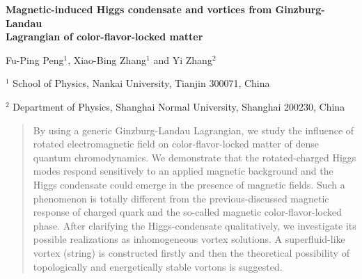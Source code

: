\documentclass[12pt]{article}
\begin{document}
\vspace{0.5cm}
\begin{center}
	\Large \bf  Magnetic-induced Higgs condensate and vortices from Ginzburg-Landau\\
	\Large\bf  Lagrangian of color-flavor-locked matter 
\end{center}

\vspace{1cm} 
\centerline{ Fu-Ping Peng$^{1}$, Xiao-Bing Zhang$^{1}$ and Yi Zhang$^{2}$}
\centerline{\small $^{1}$ School of Physics, Nankai University, Tianjin  300071, China} 
\centerline{\small $^{2}$ Department of Physics, Shanghai Normal University, Shanghai 200230, China}
 \vspace{0.5cm}

\begin{abstract}\rm \noindent
By using a generic Ginzburg-Landau Lagrangian, we study the influence of rotated electromagnetic field on color-flavor-locked matter of dense quantum chromodynamics. We demonstrate that the rotated-charged Higgs modes respond sensitively to an applied magnetic background and the Higgs condensate could emerge in the presence of magnetic fields. Such a phenomenon is totally different from the previous-discussed magnetic response of charged quark and the so-called magnetic color-flavor-locked phase.
After clarifying the Higgs-condensate qualitatively, we investigate its possible realizations as inhomogeneous vortex solutions. A superfluid-like vortex (string) is constructed firstly and then the theoretical possibility of topologically and energetically stable vortons is suggested.
\end{abstract}
\end{document}
